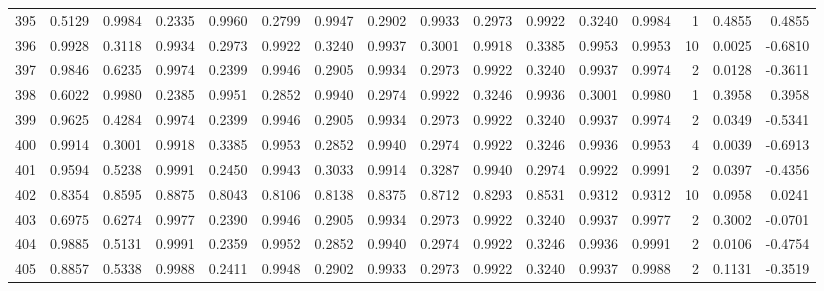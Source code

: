 \begin{tabular}{lrrrrrrrrrrrrrrr}
395 &      0.5129 &  0.9984 &  0.2335 &  0.9960 &  0.2799 &  0.9947 &  0.2902 &  0.9933 &  0.2973 &  0.9922 &   0.3240 &     0.9984 &      1 &                    0.4855 &                     0.4855 \\
396 &      0.9928 &  0.3118 &  0.9934 &  0.2973 &  0.9922 &  0.3240 &  0.9937 &  0.3001 &  0.9918 &  0.3385 &   0.9953 &     0.9953 &     10 &                    0.0025 &                    -0.6810 \\
397 &      0.9846 &  0.6235 &  0.9974 &  0.2399 &  0.9946 &  0.2905 &  0.9934 &  0.2973 &  0.9922 &  0.3240 &   0.9937 &     0.9974 &      2 &                    0.0128 &                    -0.3611 \\
398 &      0.6022 &  0.9980 &  0.2385 &  0.9951 &  0.2852 &  0.9940 &  0.2974 &  0.9922 &  0.3246 &  0.9936 &   0.3001 &     0.9980 &      1 &                    0.3958 &                     0.3958 \\
399 &      0.9625 &  0.4284 &  0.9974 &  0.2399 &  0.9946 &  0.2905 &  0.9934 &  0.2973 &  0.9922 &  0.3240 &   0.9937 &     0.9974 &      2 &                    0.0349 &                    -0.5341 \\
400 &      0.9914 &  0.3001 &  0.9918 &  0.3385 &  0.9953 &  0.2852 &  0.9940 &  0.2974 &  0.9922 &  0.3246 &   0.9936 &     0.9953 &      4 &                    0.0039 &                    -0.6913 \\
401 &      0.9594 &  0.5238 &  0.9991 &  0.2450 &  0.9943 &  0.3033 &  0.9914 &  0.3287 &  0.9940 &  0.2974 &   0.9922 &     0.9991 &      2 &                    0.0397 &                    -0.4356 \\
402 &      0.8354 &  0.8595 &  0.8875 &  0.8043 &  0.8106 &  0.8138 &  0.8375 &  0.8712 &  0.8293 &  0.8531 &   0.9312 &     0.9312 &     10 &                    0.0958 &                     0.0241 \\
403 &      0.6975 &  0.6274 &  0.9977 &  0.2390 &  0.9946 &  0.2905 &  0.9934 &  0.2973 &  0.9922 &  0.3240 &   0.9937 &     0.9977 &      2 &                    0.3002 &                    -0.0701 \\
404 &      0.9885 &  0.5131 &  0.9991 &  0.2359 &  0.9952 &  0.2852 &  0.9940 &  0.2974 &  0.9922 &  0.3246 &   0.9936 &     0.9991 &      2 &                    0.0106 &                    -0.4754 \\
405 &      0.8857 &  0.5338 &  0.9988 &  0.2411 &  0.9948 &  0.2902 &  0.9933 &  0.2973 &  0.9922 &  0.3240 &   0.9937 &     0.9988 &      2 &                    0.1131 &                    -0.3519 \\

\end{tabular}
